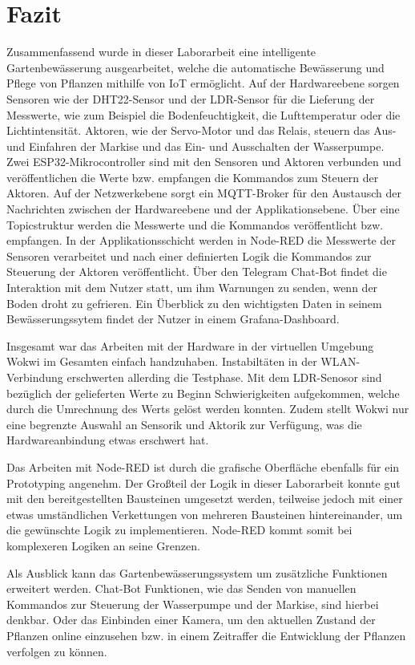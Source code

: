 
\section{Fazit}
Zusammenfassend wurde in dieser Laborarbeit eine intelligente Gartenbewässerung ausgearbeitet, welche die automatische Bewässerung und Pflege von Pflanzen mithilfe von IoT ermöglicht. Auf der Hardwareebene sorgen Sensoren wie der DHT22-Sensor und der LDR-Sensor für die Lieferung der Messwerte, wie zum Beispiel die Bodenfeuchtigkeit, die Lufttemperatur oder die Lichtintensität. Aktoren, wie der Servo-Motor und das Relais, steuern das Aus- und Einfahren der Markise und das Ein- und Ausschalten der Wasserpumpe. Zwei ESP32-Mikrocontroller sind mit den Sensoren und Aktoren verbunden und veröffentlichen die Werte bzw. empfangen die Kommandos zum Steuern der Aktoren. Auf der Netzwerkebene sorgt ein MQTT-Broker für den Austausch der Nachrichten zwischen der Hardwareebene und der Applikationsebene. Über eine Topicstruktur werden die Messwerte und die Kommandos veröffentlicht bzw. empfangen. In der Applikationsschicht werden in Node-RED die Messwerte der Sensoren verarbeitet und nach einer definierten Logik die Kommandos zur Steuerung der Aktoren veröffentlicht. Über den Telegram Chat-Bot findet die Interaktion mit dem Nutzer statt, um ihm Warnungen zu senden, wenn der Boden droht zu gefrieren. Ein Überblick zu den wichtigsten Daten in seinem Bewässerungssytem findet der Nutzer in einem Grafana-Dashboard.

Insgesamt war das Arbeiten mit der Hardware in der virtuellen Umgebung Wokwi im Gesamten einfach handzuhaben. Instabiltäten in der WLAN-Verbindung erschwerten allerding die Testphase. 
Mit dem LDR-Senosor sind bezüglich der gelieferten Werte zu Beginn Schwierigkeiten aufgekommen, welche durch die Umrechnung des Werts gelöst werden konnten. Zudem stellt Wokwi nur eine begrenzte Auswahl an Sensorik und Aktorik zur Verfügung, was die Hardwareanbindung etwas erschwert hat.

Das Arbeiten mit Node-RED ist durch die grafische Oberfläche ebenfalls für ein Prototyping angenehm. Der Großteil der Logik in dieser Laborarbeit konnte gut mit den bereitgestellten Bausteinen umgesetzt werden, teilweise jedoch mit einer etwas umständlichen Verkettungen von mehreren Bausteinen hintereinander, um die gewünschte Logik zu implementieren. Node-RED kommt somit bei komplexeren Logiken an seine Grenzen.

Als Ausblick kann das Gartenbewässerungssystem um zusätzliche Funktionen erweitert werden. Chat-Bot Funktionen, wie das Senden von manuellen Kommandos zur Steuerung der Wasserpumpe und der Markise, sind hierbei denkbar. Oder das Einbinden einer Kamera, um den aktuellen Zustand der Pflanzen online einzusehen bzw. in einem Zeitraffer die Entwicklung der Pflanzen verfolgen zu können. 